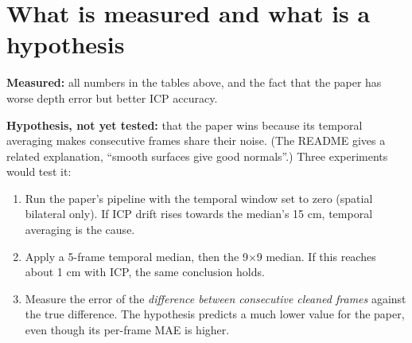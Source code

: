 \documentclass[11pt,a4paper]{article}
\begin{document}
\section*{What is measured and what is a hypothesis}
\textbf{Measured:} all numbers in the tables above, and the fact that the paper has worse depth error but better ICP accuracy.

\textbf{Hypothesis, not yet tested:} that the paper wins because its temporal averaging makes consecutive frames share their noise. (The README gives a related explanation, ``smooth surfaces give good normals''.) Three experiments would test it:
\begin{enumerate}[nosep]
\item Run the paper's pipeline with the temporal window set to zero (spatial bilateral only). If ICP drift rises towards the median's 15 cm, temporal averaging is the cause.
\item Apply a 5-frame temporal median, then the 9$\times$9 median. If this reaches about 1 cm with ICP, the same conclusion holds.
\item Measure the error of the \emph{difference between consecutive cleaned frames} against the true difference. The hypothesis predicts a much lower value for the paper, even though its per-frame MAE is higher.
\end{enumerate}
\end{document}
